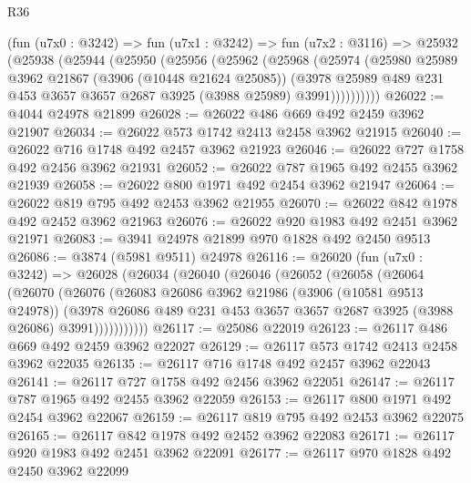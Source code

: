 \begin{lexlean}{R36}
\begin{coremodule}
    (fun (u7x0 : @3242) =>
    fun (u7x1 : @3242) =>
    fun (u7x2 : @3116) =>
    @25932
      (@25938
        (@25944
          (@25950
            (@25956
              (@25962
                (@25968
                  (@25974
                    (@25980
                      @25989
                      @3962
                      @21867
                      (@3906 (@10448 @21624 @25085))
                      (@3978
                        @25989
                        @489
                        @231
                        @453
                        @3657
                        @3657
                        @2687
                        @3925
                        (@3988 @25989)
                        @3991))))))))))
@26022 := @4044 @24978 @21899
@26028 := @26022 @486 @669 @492 @2459 @3962 @21907
@26034 := @26022 @573 @1742 @2413 @2458 @3962 @21915
@26040 := @26022 @716 @1748 @492 @2457 @3962 @21923
@26046 := @26022 @727 @1758 @492 @2456 @3962 @21931
@26052 := @26022 @787 @1965 @492 @2455 @3962 @21939
@26058 := @26022 @800 @1971 @492 @2454 @3962 @21947
@26064 := @26022 @819 @795 @492 @2453 @3962 @21955
@26070 := @26022 @842 @1978 @492 @2452 @3962 @21963
@26076 := @26022 @920 @1983 @492 @2451 @3962 @21971
@26083 := @3941 @24978 @21899 @970 @1828 @492 @2450 @9513
@26086 := @3874 (@5981 @9511) @24978
@26116 := @26020
    (fun (u7x0 : @3242) =>
    @26028
      (@26034
        (@26040
          (@26046
            (@26052
              (@26058
                (@26064
                  (@26070
                    (@26076
                      (@26083
                        @26086
                        @3962
                        @21986
                        (@3906 (@10581 @9513 @24978))
                        (@3978
                          @26086
                          @489
                          @231
                          @453
                          @3657
                          @3657
                          @2687
                          @3925
                          (@3988 @26086)
                          @3991)))))))))))
@26117 := @25086 @22019
@26123 := @26117 @486 @669 @492 @2459 @3962 @22027
@26129 := @26117 @573 @1742 @2413 @2458 @3962 @22035
@26135 := @26117 @716 @1748 @492 @2457 @3962 @22043
@26141 := @26117 @727 @1758 @492 @2456 @3962 @22051
@26147 := @26117 @787 @1965 @492 @2455 @3962 @22059
@26153 := @26117 @800 @1971 @492 @2454 @3962 @22067
@26159 := @26117 @819 @795 @492 @2453 @3962 @22075
@26165 := @26117 @842 @1978 @492 @2452 @3962 @22083
@26171 := @26117 @920 @1983 @492 @2451 @3962 @22091
@26177 := @26117 @970 @1828 @492 @2450 @3962 @22099

\end{coremodule}
\end{lexlean}
